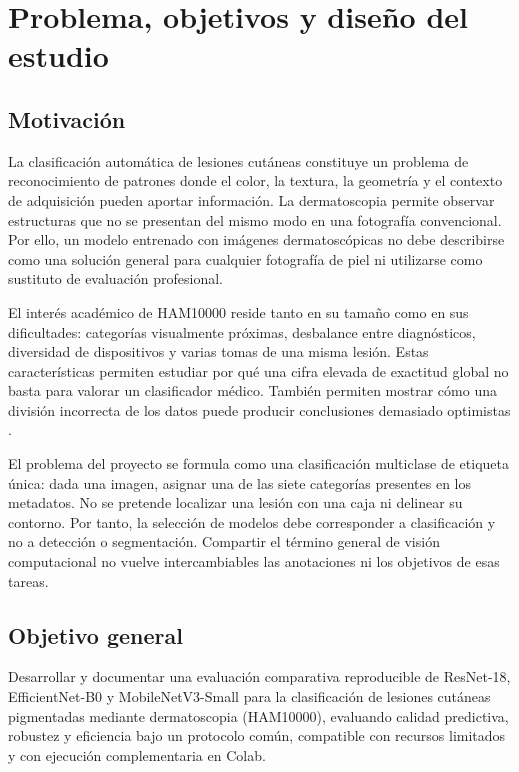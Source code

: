 \FloatBarrier\section{Problema, objetivos y diseño del estudio}

\subsection{Motivación}
La clasificación automática de lesiones cutáneas constituye un problema de reconocimiento de patrones donde el color, la textura, la geometría y el contexto de adquisición pueden aportar información. La dermatoscopia permite observar estructuras que no se presentan del mismo modo en una fotografía convencional. Por ello, un modelo entrenado con imágenes dermatoscópicas no debe describirse como una solución general para cualquier fotografía de piel ni utilizarse como sustituto de evaluación profesional.

El interés académico de HAM10000 reside tanto en su tamaño como en sus dificultades: categorías visualmente próximas, desbalance entre diagnósticos, diversidad de dispositivos y varias tomas de una misma lesión. Estas características permiten estudiar por qué una cifra elevada de exactitud global no basta para valorar un clasificador médico. También permiten mostrar cómo una división incorrecta de los datos puede producir conclusiones demasiado optimistas \cite{tschandl2018}.

El problema del proyecto se formula como una clasificación multiclase de etiqueta única: dada una imagen, asignar una de las siete categorías presentes en los metadatos. No se pretende localizar una lesión con una caja ni delinear su contorno. Por tanto, la selección de modelos debe corresponder a clasificación y no a detección o segmentación. Compartir el término general de visión computacional no vuelve intercambiables las anotaciones ni los objetivos de esas tareas.

\subsection{Objetivo general}
Desarrollar y documentar una evaluación comparativa reproducible de ResNet-18, EfficientNet-B0 y MobileNetV3-Small para la clasificación de lesiones cutáneas pigmentadas mediante dermatoscopia (HAM10000), evaluando calidad predictiva, robustez y eficiencia bajo un protocolo común, compatible con recursos limitados y con ejecución complementaria en Colab.

